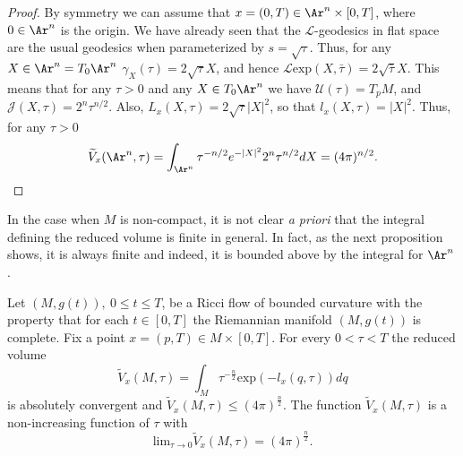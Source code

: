 \begin{proof}
By symmetry we can assume that $x=(0,T)\in \Ar^n\times [0,T]$, where
$0\in \Ar^n$ is the origin. We have already seen that the ${\mathcal
L}$-geodesics in flat space are the usual geodesics when
parameterized by $s=\sqrt{\tau}$. Thus, for any $X\in
\Ar^n=T_0\Ar^n$ $\gamma_X(\tau)=2\sqrt{\tau}X$, and hence ${\mathcal
L}\mathrm{exp}(X,\bar\tau)=2\sqrt{\bar\tau}X$. This means that for any
$\tau>0$ and any $X\in T_0\Ar^n$ we have ${\mathcal U}(\tau)=T_pM$,
and ${\mathcal J}(X,\tau)=2^n\tau^{n/2}$. Also,
 $L_x(X,\tau)=2\sqrt{\tau}|X|^2$, so that $l_x(X,\tau)=|X|^2$.
 Thus, for any $\tau>0$
 $$\widetilde
 V_x(\Ar^n,\tau)=\int_{\Ar^n}\tau^{-n/2}e^{-|X|^2}2^n\tau^{n/2}dX=(4\pi)^{n/2}.$$
\end{proof}


In the case when $M$ is non-compact, it is not clear {\em a priori}
that the integral defining the reduced volume is finite in general.
In fact, as the next proposition shows, it is always finite and
indeed, it is bounded above by the integral for  $\Ar^n$.

\begin{theorem}
\label{thm:reduced-volume-monotone-bound}
\label{4pi} Let $(M,g(t)),\ 0\le t\le T$, be a Ricci flow
of bounded curvature with the property that for each $t\in [0,T]$
the Riemannian manifold $(M,g(t))$ is complete. Fix a point
$x=(p,T)\in M\times [0,T]$. For every $0<\tau<T$ the reduced volume
$$\widetilde V_x(M,\tau)=\int_{M} \tau^{-\frac{n}{2}}\mathrm{exp}(-l_x(q,\tau))dq$$
is absolutely convergent and  $\widetilde V_x(M,\tau)\le
(4\pi)^{\frac{n}{2}}$. The function $\widetilde V_x(M,\tau)$ is a
non-increasing function of $\tau$ with
$$\mathrm{lim}_{\tau\rightarrow 0}\widetilde V_x(M,\tau)=(4\pi)^{\frac{n}{2}}.$$
\end{theorem}

